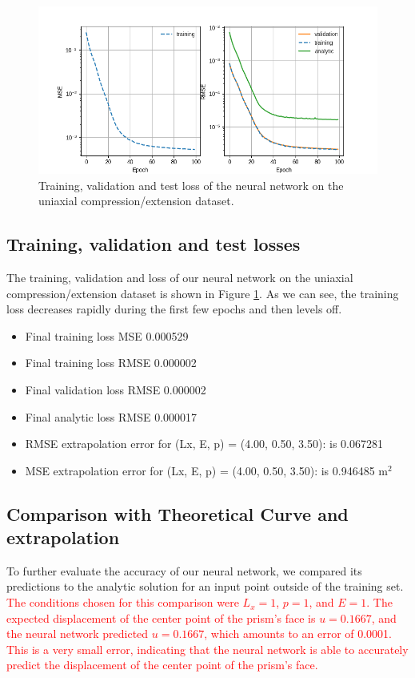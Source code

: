 \documentclass[11pt]{scrartcl} %
\begin{document}
\begin{figure}[htpb!]
	\centering
	\includegraphics[width=1\textwidth]{Figures/Example1_losses.png}
	\caption{Training, validation and test loss of the neural network on the uniaxial compression/extension dataset.}
	\label{fig:train_loss}
	\end{figure}

\subsection{Training, validation and test losses}
The training, validation and  loss of our neural network on the uniaxial compression/extension dataset is shown in Figure \ref{fig:train_loss}. As we can see, the training loss decreases rapidly during the first few epochs and then levels off. 

\begin{itemize}
\item Final training loss MSE 0.000529  
\item  Final training loss RMSE 0.000002  
\item Final validation loss RMSE 0.000002  
\item  Final analytic loss RMSE 0.000017  
\item RMSE extrapolation error for (Lx, E, p) = (4.00, 0.50, 3.50): is 0.067281
\item MSE extrapolation error for (Lx, E, p) = (4.00, 0.50, 3.50): is 0.946485 m$^2$
\end{itemize}

\subsection{Comparison with Theoretical Curve and extrapolation}
To further evaluate the accuracy of our neural network, we compared its predictions to the analytic solution for an input point outside of the training set. \textcolor{red}{The conditions chosen for this comparison were $L_x = 1$, $p = 1$, and $E = 1$. The expected displacement of the center point of the prism's face is $u = 0.1667$, and the neural network predicted $u = 0.1667$, which amounts to an error of 0.0001. This is a very small error, indicating that the neural network is able to accurately predict the displacement of the center point of the prism's face.}
\end{document}
